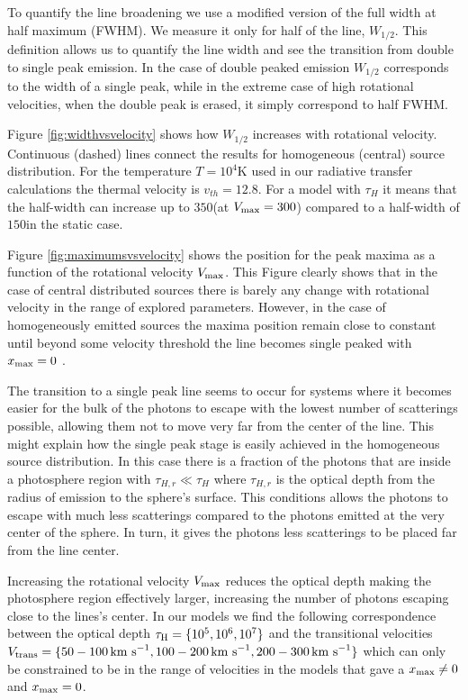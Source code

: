 \documentclass[usenatbib]{mn2e}
\newcommand{\kms}{{\ifmmode{{\mathrm{\,km\ s}^{-1}}}\else{\,km~s$^{-1}$}\fi}}
\begin{document}
To quantify the line broadening we use a modified version of the full
width at half maximum (FWHM). We measure it only for half of
the line, $W_{1/2}$. This definition allows us to quantify the line
width and see the transition from double to single peak emission.  In the
case of double peaked emission $W_{1/2}$ corresponds to the width of a
single peak, while in the extreme case of high rotational velocities,
when the double peak is erased, it simply correspond to half FWHM.  

Figure \ref{fig:widthvsvelocity} shows how $W_{1/2}$ increases with
rotational velocity. Continuous (dashed) lines connect the results for
homogeneous (central) source distribution. For the temperature
$T=10^4$K used in our radiative transfer calculations the thermal
velocity is $v_{th}=12.8$\kms. For a model with $\tau_{H}$ it means
that the half-width can increase up to $350$\kms (at $V_{\rm
  max}=300$\kms) compared to a half-width of $150$\kms in the static
case.   

Figure \ref{fig:maximumsvsvelocity} shows the position for the peak
maxima as a function of the rotational velocity $V_{\rm max}$. This
Figure clearly shows that in the case of central distributed
sources there is barely any change with rotational velocity in the
range of explored parameters. However, in the case of
homogeneously emitted sources the maxima position remain close to
constant until beyond some velocity threshold the line becomes single
peaked with $x_{\rm max}=0$ \kms. 

The transition to a single peak line seems to occur for systems
where it becomes easier for the bulk of the photons to escape with the lowest
number of scatterings possible, allowing them not to move very far
from the center of the line. This might explain how the single peak stage
is easily achieved in the homogeneous source distribution. In this
case there is a fraction of the photons that are inside a photosphere
region with $\tau_{H,r}\ll \tau_{H}$ where $\tau_{H,r}$ is the optical
depth from the radius of emission to the sphere's surface. This
conditions allows the photons to escape with much less scatterings
compared to the photons emitted at the very center of the sphere. In
turn, it gives the photons less scatterings to be placed far from the
line center. 

Increasing the rotational velocity $V_{\rm max}$ reduces
the optical depth making the photosphere region effectively larger,
increasing the number of photons escaping close to the lines's
center. In our models we find the following correspondence between the
optical depth $\tau_{\rm H}=\{10^5, 10^6, 10^7\}$ and the transitional
velocities $V_{\rm   trans}=\{50-100\kms, 100-200\kms, 200-300\kms\}$
which can only be constrained to be in the range of velocities in the
models that gave a $x_{\rm max}\neq 0$ and $x_{\rm max}=0$.  
\end{document}
